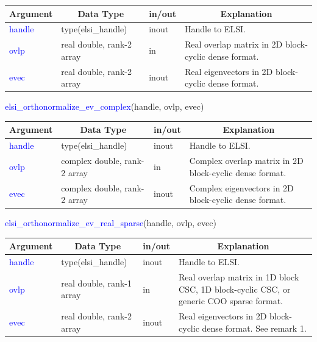 \documentclass{report}
\newcommand{\tcb}[1]{\textcolor{blue}{#1}}
\begin{document}
\begin{tabular}[]{|p{20mm}|p{45mm}|p{15mm}|p{85mm}|}
\hline
\multicolumn{1}{|c|}{\textbf{Argument}} & \multicolumn{1}{c|}{\textbf{Data Type}} & \multicolumn{1}{c|}{\textbf{in/out}} & \multicolumn{1}{c|}{\textbf{Explanation}}\\
\hline
\tcb{handle} & type(elsi\_handle)        & inout & Handle to ELSI.\\
\hline
\tcb{ovlp}   & real double, rank-2 array & in    & Real overlap matrix in 2D block-cyclic dense format.\\
\hline
\tcb{evec}   & real double, rank-2 array & inout & Real eigenvectors in 2D block-cyclic dense format.\\
\hline
\end{tabular}

\newpage
\begin{labeling}{\hspace{6cm}}
\item [\hspace{0.3cm} \tcb{elsi\_orthonormalize\_ev\_complex}(handle, ovlp, evec)]
\end{labeling}

\begin{tabular}[]{|p{20mm}|p{45mm}|p{15mm}|p{85mm}|}
\hline
\multicolumn{1}{|c|}{\textbf{Argument}} & \multicolumn{1}{c|}{\textbf{Data Type}} & \multicolumn{1}{c|}{\textbf{in/out}} & \multicolumn{1}{c|}{\textbf{Explanation}}\\
\hline
\tcb{handle} & type(elsi\_handle)           & inout & Handle to ELSI.\\
\hline
\tcb{ovlp}   & complex double, rank-2 array & in    & Complex overlap matrix in 2D block-cyclic dense format.\\
\hline
\tcb{evec}   & complex double, rank-2 array & inout & Complex eigenvectors in 2D block-cyclic dense format.\\
\hline
\end{tabular}

\begin{labeling}{\hspace{6cm}}
\item [\hspace{0.3cm} \tcb{elsi\_orthonormalize\_ev\_real\_sparse}(handle, ovlp, evec)]
\end{labeling}

\begin{tabular}[]{|p{20mm}|p{45mm}|p{15mm}|p{85mm}|}
\hline
\multicolumn{1}{|c|}{\textbf{Argument}} & \multicolumn{1}{c|}{\textbf{Data Type}} & \multicolumn{1}{c|}{\textbf{in/out}} & \multicolumn{1}{c|}{\textbf{Explanation}}\\
\hline
\tcb{handle} & type(elsi\_handle)        & inout & Handle to ELSI.\\
\hline
\tcb{ovlp}   & real double, rank-1 array & in    & Real overlap matrix in 1D block CSC, 1D block-cyclic CSC, or generic COO sparse format.\\
\hline
\tcb{evec}   & real double, rank-2 array & inout & Real eigenvectors in 2D block-cyclic dense format. See remark 1.\\
\hline
\end{tabular}
\end{document}
